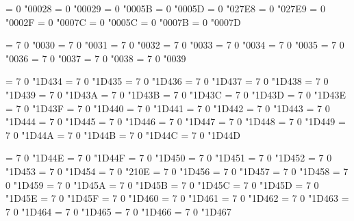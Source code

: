 
  = 0 "00028 %
  = 0 "00029 %
  = 0 "0005B %
  = 0 "0005D %
  = 0 "027E8 %
  = 0 "027E9 %
  = 0 "0002F %
 = 0 "0007C %
  = 0 "0005C %
 = 0 "0007B %
 = 0 "0007D %

 = 7 0 "0030 %
 = 7 0 "0031 %
 = 7 0 "0032 %
 = 7 0 "0033 %
 = 7 0 "0034 %
 = 7 0 "0035 %
 = 7 0 "0036 %
 = 7 0 "0037 %
 = 7 0 "0038 %
 = 7 0 "0039 %

 = 7 0 "1D434 %
 = 7 0 "1D435 %
 = 7 0 "1D436 %
 = 7 0 "1D437 %
 = 7 0 "1D438 %
 = 7 0 "1D439 %
 = 7 0 "1D43A %
 = 7 0 "1D43B %
 = 7 0 "1D43C %
 = 7 0 "1D43D %
 = 7 0 "1D43E %
 = 7 0 "1D43F %
 = 7 0 "1D440 %
 = 7 0 "1D441 %
 = 7 0 "1D442 %
 = 7 0 "1D443 %
 = 7 0 "1D444 %
 = 7 0 "1D445 %
 = 7 0 "1D446 %
 = 7 0 "1D447 %
 = 7 0 "1D448 %
 = 7 0 "1D449 %
 = 7 0 "1D44A %
 = 7 0 "1D44B %
 = 7 0 "1D44C %
 = 7 0 "1D44D %

 = 7 0 "1D44E %
 = 7 0 "1D44F %
 = 7 0 "1D450 %
 = 7 0 "1D451 %
 = 7 0 "1D452 %
 = 7 0 "1D453 %
 = 7 0 "1D454 %
 = 7 0 "210E %
 = 7 0 "1D456 %
 = 7 0 "1D457 %
 = 7 0 "1D458 %
 = 7 0 "1D459 %
 = 7 0 "1D45A %
 = 7 0 "1D45B %
 = 7 0 "1D45C %
 = 7 0 "1D45D %
 = 7 0 "1D45E %
 = 7 0 "1D45F %
 = 7 0 "1D460 %
 = 7 0 "1D461 %
 = 7 0 "1D462 %
 = 7 0 "1D463 %
 = 7 0 "1D464 %
 = 7 0 "1D465 %
 = 7 0 "1D466 %
 = 7 0 "1D467 %

